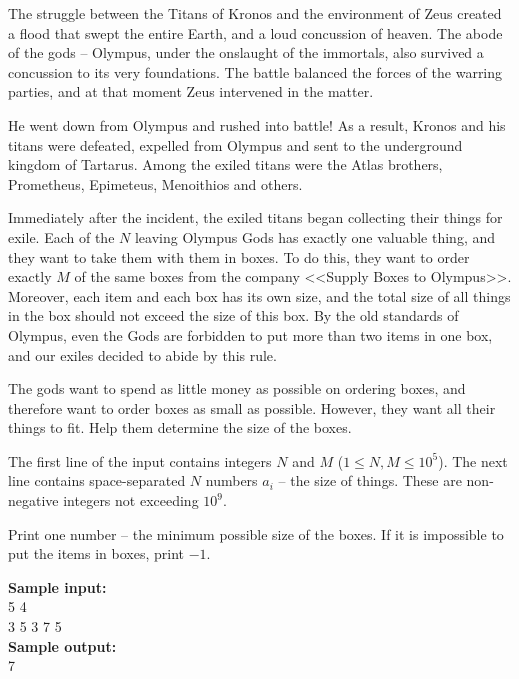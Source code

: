\documentclass[a4paper]{article}
\begin{document}
The struggle between the Titans of Kronos and the environment of Zeus created a flood that swept the entire Earth, and a loud concussion of heaven. The abode of the gods -- Olympus, under the onslaught of the immortals, also survived a concussion to its very foundations. The battle balanced the forces of the warring parties, and at that moment Zeus intervened in the matter.

He went down from Olympus and rushed into battle! As a result, Kronos and his titans were defeated, expelled from Olympus and sent to the underground kingdom of Tartarus. Among the exiled titans were the Atlas brothers, Prometheus, Epimeteus, Menoithios and others.

Immediately after the incident, the exiled titans began collecting their things for exile. Each of the $N$ leaving Olympus Gods has exactly one valuable thing, and they want to take them with them in boxes. To do this, they want to order exactly $M$ of the same boxes from the company <<Supply Boxes to Olympus>>. Moreover, each item and each box has its own size, and the total size of all things in the box should not exceed the size of this box. By the old standards of Olympus, even the Gods are forbidden to put more than two items in one box, and our exiles decided to abide by this rule.

The gods want to spend as little money as possible on ordering boxes, and therefore want to order boxes as small as possible. However, they want all their things to fit. Help them determine the size of the boxes.

The first line of the input contains integers $N$ and $M$ ($1 \le N, M \le 10^5$). The next line contains space-separated $N$ numbers $a_i$ -- the size of things. These are non-negative integers not exceeding $10^9$.

Print one number -- the minimum possible size of the boxes. If it is impossible to put the items in boxes, print $-1$.

\LINE

\noindent \textbf{Sample input:}\\
5 4\\
3 5 3 7 5\\


\noindent \textbf{Sample output:}\\
7
\end{document}
